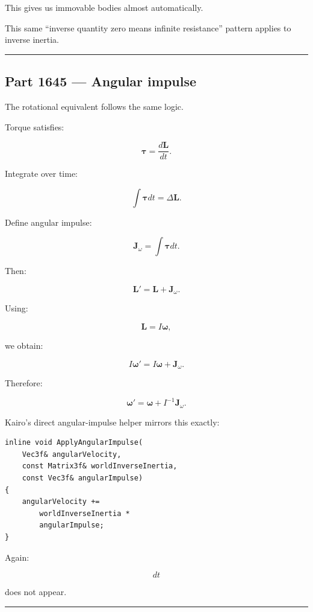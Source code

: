 This gives us immovable bodies almost automatically.

This same ``inverse quantity zero means infinite resistance'' pattern applies to inverse inertia.

\begin{center}\rule{0.5\linewidth}{0.5pt}\end{center}

\subsection{Part 1645 --- Angular impulse}\label{06-engine-ii-ch036-part-1645-angular-impulse}

The rotational equivalent follows the same logic.

Torque satisfies:

\[
\boldsymbol\tau
=
\frac{d\mathbf L}{dt}.
\]

Integrate over time:

\[
\int\boldsymbol\tau dt
=
\Delta\mathbf L.
\]

Define angular impulse:

\[
\boxed{
\mathbf J_\omega
=
\int\boldsymbol\tau dt.
}
\]

Then:

\[
\boxed{
\mathbf L'
=
\mathbf L+
\mathbf J_\omega.
}
\]

Using:

\[
\mathbf L=I\boldsymbol\omega,
\]

we obtain:

\[
I\boldsymbol\omega'
=
I\boldsymbol\omega+
\mathbf J_\omega.
\]

Therefore:

\[
\boxed{
\boldsymbol\omega'
=
\boldsymbol\omega+
I^{-1}\mathbf J_\omega.
}
\]

Kairo's direct angular-impulse helper mirrors this exactly:

\begin{verbatim}
inline void ApplyAngularImpulse(
    Vec3f& angularVelocity,
    const Matrix3f& worldInverseInertia,
    const Vec3f& angularImpulse)
{
    angularVelocity +=
        worldInverseInertia *
        angularImpulse;
}
\end{verbatim}

Again:

\[
dt
\]

does not appear.

\begin{center}\rule{0.5\linewidth}{0.5pt}\end{center}

